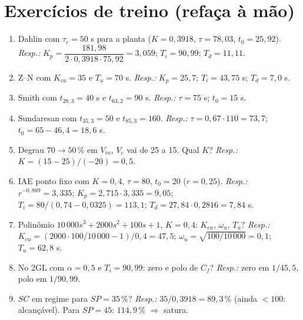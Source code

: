 \documentclass[11pt,a4paper]{article}
\newcommand{\Vin}{V_{in}}
\begin{document}
\section{Exercícios de treino (refaça à mão)}\label{exerc}
\begin{enumerate}[leftmargin=*]
\item Dahlin com $\tau_c=50$ s para a planta ($K=0{,}3918$, $\tau=78{,}03$, $t_0=25{,}92$). \emph{Resp.:} $K_p=\dfrac{181{,}98}{2\cdot0{,}3918\cdot75{,}92}=3{,}059$; $T_i=90{,}99$; $T_d=11{,}11$.
\item Z--N com $K_{cu}=35$ e $T_u=70$ s. \emph{Resp.:} $K_p=25{,}7$; $T_i=43{,}75$ s; $T_d=7{,}0$ s.
\item Smith com $t_{28,3}=40$ s e $t_{63,2}=90$ s. \emph{Resp.:} $\tau=75$ s; $t_0=15$ s.
\item Sundaresan com $t_{35,3}=50$ e $t_{85,3}=160$. \emph{Resp.:} $\tau=0{,}67\cdot110=73{,}7$; $t_0=65-46{,}4=18{,}6$ s.
\item Degrau $70\to50\,\%$ em $\Vin$, $V_c$ vai de 25 a 15. Qual $K$? \emph{Resp.:} $K=(15-25)/(-20)=0{,}5$.
\item IAE ponto fixo com $K=0{,}4$, $\tau=80$, $t_0=20$ ($r=0{,}25$). \emph{Resp.:} $r^{-0{,}869}=3{,}335$; $K_p=2{,}715\cdot3{,}335=9{,}05$; $T_i=80/(0{,}74-0{,}0325)=113{,}1$; $T_d=27{,}84\cdot0{,}2816=7{,}84$ s.
\item Polinômio $10\,000s^3+2000s^2+100s+1$, $K=0{,}4$: $K_{cu}$, $\omega_u$, $T_u$? \emph{Resp.:} $K_{cu}=(2000\cdot100/10\,000-1)/0{,}4=47{,}5$; $\omega_u=\sqrt{100/10\,000}=0{,}1$; $T_u=62{,}8$ s.
\item No 2GL com $\alpha=0{,}5$ e $T_i=90{,}99$: zero e polo de $C_f$? \emph{Resp.:} zero em $1/45{,}5$, polo em $1/90{,}99$.
\item $SC$ em regime para $SP=35\,\%$? \emph{Resp.:} $35/0{,}3918=89{,}3\,\%$ (ainda $<100$: alcançável). Para $SP=45$: $114{,}9\,\%$ $\Rightarrow$ satura.
\end{enumerate}
\end{document}
